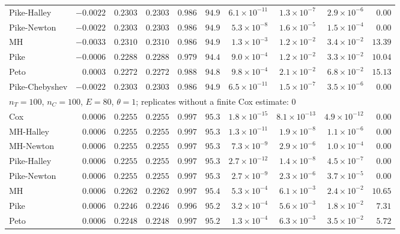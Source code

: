\begin{landscape}
\begin{longtable}{lrrrrrrrrr}
Pike-Halley & $-0.0022$ & $0.2303$ & $0.2303$ & $0.986$ & $94.9$ & $6.1 \times 10^{-11}$ & $1.3 \times 10^{-7}$ & $2.9 \times 10^{-6}$ & $0.00$ \\
Pike-Newton & $-0.0022$ & $0.2303$ & $0.2303$ & $0.986$ & $94.9$ & $5.3 \times 10^{-8}$ & $1.6 \times 10^{-5}$ & $1.5 \times 10^{-4}$ & $0.00$ \\
MH & $-0.0033$ & $0.2310$ & $0.2310$ & $0.986$ & $94.9$ & $1.3 \times 10^{-3}$ & $1.2 \times 10^{-2}$ & $3.4 \times 10^{-2}$ & $13.39$ \\
Pike & $-0.0006$ & $0.2288$ & $0.2288$ & $0.979$ & $94.4$ & $9.0 \times 10^{-4}$ & $1.2 \times 10^{-2}$ & $3.3 \times 10^{-2}$ & $10.04$ \\
Peto & $0.0003$ & $0.2272$ & $0.2272$ & $0.988$ & $94.8$ & $9.8 \times 10^{-4}$ & $2.1 \times 10^{-2}$ & $6.8 \times 10^{-2}$ & $15.13$ \\
Pike-Chebyshev & $-0.0022$ & $0.2303$ & $0.2303$ & $0.986$ & $94.9$ & $6.5 \times 10^{-11}$ & $1.5 \times 10^{-7}$ & $3.5 \times 10^{-6}$ & $0.00$ \\
\multicolumn{10}{l}{$n_T = 100$, $n_C = 100$, $E = 80$, $\theta = 1$; replicates without a finite Cox estimate: 0} \\
Cox & $0.0006$ & $0.2255$ & $0.2255$ & $0.997$ & $95.3$ & $1.8 \times 10^{-15}$ & $8.1 \times 10^{-13}$ & $4.9 \times 10^{-12}$ & $0.00$ \\
MH-Halley & $0.0006$ & $0.2255$ & $0.2255$ & $0.997$ & $95.3$ & $1.3 \times 10^{-11}$ & $1.9 \times 10^{-8}$ & $1.1 \times 10^{-6}$ & $0.00$ \\
MH-Newton & $0.0006$ & $0.2255$ & $0.2255$ & $0.997$ & $95.3$ & $7.3 \times 10^{-9}$ & $2.9 \times 10^{-6}$ & $1.0 \times 10^{-4}$ & $0.00$ \\
Pike-Halley & $0.0006$ & $0.2255$ & $0.2255$ & $0.997$ & $95.3$ & $2.7 \times 10^{-12}$ & $1.4 \times 10^{-8}$ & $4.5 \times 10^{-7}$ & $0.00$ \\
Pike-Newton & $0.0006$ & $0.2255$ & $0.2255$ & $0.997$ & $95.3$ & $2.7 \times 10^{-9}$ & $2.3 \times 10^{-6}$ & $3.7 \times 10^{-5}$ & $0.00$ \\
MH & $0.0006$ & $0.2262$ & $0.2262$ & $0.997$ & $95.4$ & $5.3 \times 10^{-4}$ & $6.1 \times 10^{-3}$ & $2.4 \times 10^{-2}$ & $10.65$ \\
Pike & $0.0006$ & $0.2246$ & $0.2246$ & $0.996$ & $95.2$ & $3.2 \times 10^{-4}$ & $5.6 \times 10^{-3}$ & $1.8 \times 10^{-2}$ & $7.31$ \\
Peto & $0.0006$ & $0.2248$ & $0.2248$ & $0.997$ & $95.2$ & $1.3 \times 10^{-4}$ & $6.3 \times 10^{-3}$ & $3.5 \times 10^{-2}$ & $5.72$ \\

\end{longtable}
\end{landscape}

